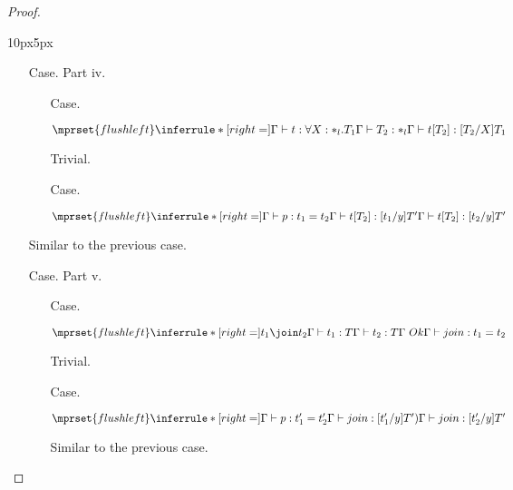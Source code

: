 \begin{proof}
\begin{changemargin}{10px}{5px}
\begin{itemize}
\item[Case.] Part iv.\\
    \vspace{-30px}
  \begin{itemize}
  \item[Case.] \ \\
    \begin{center}
      \begin{math}
        $$\mprset{flushleft}
        \inferrule* [right=] {
          \Gamma \vdash t:\forall X:*_l.T_1
          \\
          \Gamma \vdash T_2:*_l
        }{\Gamma \vdash t[T_2]: [T_2/X]T_1}
      \end{math} 
    \end{center}
    Trivial.

  \item[Case.] \ \\
    \begin{center}
      \begin{math}
        $$\mprset{flushleft}
        \inferrule* [right=] {
          \Gamma \vdash p:t_1 = t_2
          \\
          \Gamma \vdash t[T_2]:[t_1/y]T'
        }{\Gamma \vdash t[T_2]:[t_2/y]T'}
      \end{math}
    \end{center}
  \end{itemize}
  Similar to the previous case.

\item[Case.] Part v.\\
    \vspace{-30px}
  \begin{itemize}
  \item[Case.] \ \\
    \begin{center}
      \begin{math}
        $$\mprset{flushleft}
        \inferrule* [right=] {
          t_1 \join t_2
	  \\
          \Gamma \vdash t_1:T
          \\
          \Gamma \vdash t_2:T
          \\
	  \Gamma\ Ok
        }{\Gamma \vdash join : t_1 = t_2}
      \end{math}
    \end{center}
    Trivial.
  
  \item[Case.] \ \\
    \begin{center}
      \begin{math}
        $$\mprset{flushleft}
        \inferrule* [right=] {
          \Gamma \vdash p:t'_1 = t'_2
          \\
          \Gamma \vdash join:[t'_1/y]T')
        }{\Gamma \vdash join:[t'_2/y]T'}
      \end{math}
    \end{center}
    Similar to the previous case.
  \end{itemize}
\end{itemize}
\end{changemargin}
\end{proof}

